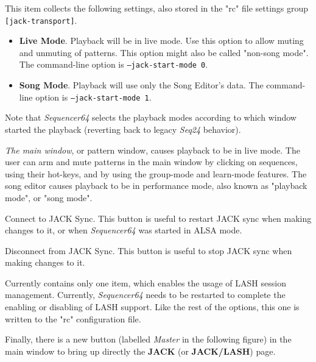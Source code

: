    This item collects the following settings, also stored in the "rc" file
   settings group \texttt{[jack-transport]}.

   \begin{itemize}
      \item \textbf{Live Mode}.
         Playback will be in live mode.  Use this option to allow muting and
         unmuting of patterns.  This option might also be called "non-song
         mode".
         The command-line option is \texttt{--jack-start-mode 0}.
      \item \textbf{Song Mode}.
         Playback will use only the Song Editor's data.
         The command-line option is \texttt{--jack-start-mode 1}.
   \end{itemize}

   Note that \textsl{Sequencer64} 
   selects the playback modes
   according to which window started the playback
   (reverting back to legacy \textsl{Seq24} behavior).

   \textsl{The main window}, or pattern
   window, causes playback to be in live mode.  The user can arm and mute
   patterns in the main window by clicking on sequences, using their hot-keys,
   and by using the group-mode and learn-mode features.
   The song editor causes playback to be in performance mode, also known as
   "playback mode", or "song mode".

   Connect to JACK Sync.
   This button is useful to restart JACK sync when making changes to it,
   or when \textsl{Sequencer64} was started in ALSA mode.

   Disconnect from JACK Sync.
   This button is useful to stop JACK sync when making changes to it.

   Currently contains only one item, which enables the usage of LASH session
   management.  Currently, \textsl{Sequencer64} needs to be restarted to
   complete the enabling or disabling of LASH support.  Like the rest of the
   options, this one is written to the "rc" configuration file.

   Finally, there is a new button (labelled \textsl{Master} in the following
   figure) in the main window to bring up directly the
   \textbf{JACK} (or \textbf{JACK/LASH}) page.

